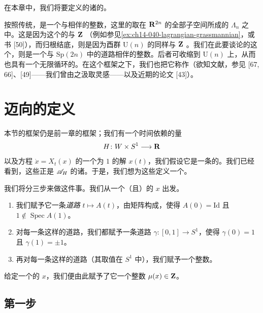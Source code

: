 
在本章中，我们将要定义\trActionFunctional{}的诸\trCriticalPoint{}的\trIndex。

按照传统，\trMaslovIndex{}是一个与\trLoop{}相伴的整数，这里的\trLoop{}取在 $\mathbf{R}^{2n}$ 的全部\trLagrange{}子空间所成的\trGrassmann\trManifold{} $\Lambda_n$ 之中。这是因为这个\trGrassmann\trManifold{}的\trFundamentalGroup{}与 $\mathbf{Z}$ \trIsomorphic（例如参见\cref{ex:ch14-040-lagrangian-grassmannian}，或书 [50]），而归根结底，则是因为酉群 $\mathrm{U}(n)$ 的\trFundamentalGroup{}同样与 $\mathbf{Z}$ \trIsomorphic。我们在此要谈论的这个\trIndex，则是一个与\trSymplecticGroup{} $\mathrm{Sp}(2n)$ 中的道路相伴的整数。后者可收缩到 $\mathrm{U}(n)$ 上，从而也具有一个无限循环的\trFundamentalGroup。在这个框架之下，我们也把它称作\trConleyZehnderIndex（欲知文献，参见 [67, 66]、[49]——我们曾由之汲取灵感——以及近期的论文 [43]）。

\section{迈向\trIndex{}的定义}
\label{sec:toward-definition-index}

本节的框架仍是前一章的框架；我们有一个时间依赖的\trHamiltonian{}量
\[
H\colon W\times S^1\longrightarrow\mathbf{R}
\]
以及方程 $\dot{x}=X_t(x)$ 的一个\trPeriodic{}为 $1$ 的解 $x(t)$，我们假设它是一条\trContractible{}的\trLoop。我们已经看到，这些\trLoop{}正是 $\mathscr{A}_H$ 的诸\trCriticalPoint。于是，我们想为这些\trCriticalPoint{}定义一个\trIndex。

我们将分三步来做这件事。我们从一个\trNondegenerate{}（且\trContractible{}）的\trTrajectory{} $x$ 出发。

\begin{enumerate}[label=(\arabic*)]
\item 我们赋予它一条\emph{道路} $t\mapsto A(t)$，由\emph{\trSymplectic}矩阵构成，使得 $A(0)=\mathrm{Id}$ 且 $1\notin\operatorname{Spec}A(1)$。
\item 对每一条这样的道路，我们都赋予一条道路 $\gamma\colon[0,1]\to S^1$，使得 $\gamma(0)=1$ 且 $\gamma(1)=\pm1$。
\item 再对每一条这样的道路（其取值在 $S^1$ 中），我们赋予一个整数。
\end{enumerate}

给定一个\trNondegenerate{}的\trCriticalPoint{} $x$，我们便由此赋予了它一个整数 $\mu(x)\in\mathbf{Z}$。

\subsection{第一步}
\label{subsec:first-step}

